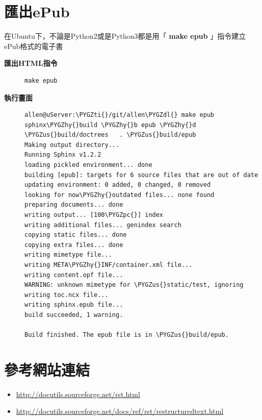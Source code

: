 \documentclass[letterpaper,10pt,english]{sphinxmanual}
\def\PYGZus{\char`\_}
\def\PYGZpc{\char`\%}
\def\PYGZdl{\char`\$}
\def\PYGZhy{\char`\-}
\def\PYGZti{\char`\~}
\begin{document}
\section{匯出ePub}
\label{_doc/sphinx-doc/index:epub}
在Ubuntu下，不論是Python2或是Python3都是用「 \textbf{make epub} 」指令建立ePub格式的電子書
\begin{description}
\item[{\textbf{匯出HTML指令}}] \leavevmode
\begin{Verbatim}[commandchars=\\\{\}]
make epub
\end{Verbatim}

\item[{\textbf{執行畫面}}] \leavevmode
\begin{Verbatim}[commandchars=\\\{\}]
allen@uServer:\PYGZti{}/git/allen\PYGZdl{} make epub
sphinx\PYGZhy{}build \PYGZhy{}b epub \PYGZhy{}d \PYGZus{}build/doctrees   . \PYGZus{}build/epub
Making output directory...
Running Sphinx v1.2.2
loading pickled environment... done
building [epub]: targets for 6 source files that are out of date
updating environment: 0 added, 0 changed, 0 removed
looking for now\PYGZhy{}outdated files... none found
preparing documents... done
writing output... [100\PYGZpc{}] index
writing additional files... genindex search
copying static files... done
copying extra files... done
writing mimetype file...
writing META\PYGZhy{}INF/container.xml file...
writing content.opf file...
WARNING: unknown mimetype for \PYGZus{}static/test, ignoring
writing toc.ncx file...
writing sphinx.epub file...
build succeeded, 1 warning.

Build finished. The epub file is in \PYGZus{}build/epub.
\end{Verbatim}

\end{description}


\section{參考網站連結}
\label{_doc/sphinx-doc/index:id6}\begin{itemize}
\item {} 
\href{http://docutils.sourceforge.net/rst.html}{http://docutils.sourceforge.net/rst.html}

\item {} 
\href{http://docutils.sourceforge.net/docs/ref/rst/restructuredtext.html}{http://docutils.sourceforge.net/docs/ref/rst/restructuredtext.html}

\end{itemize}
\end{document}
